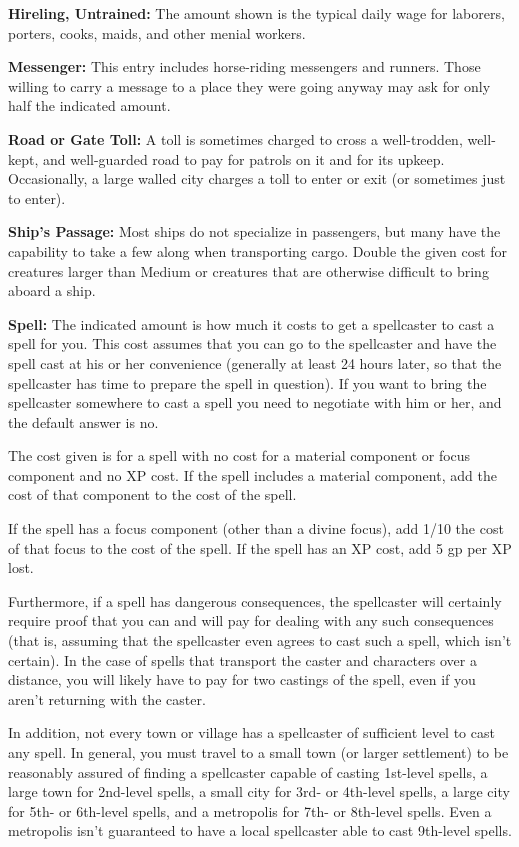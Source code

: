 \textbf{Hireling, Untrained:} The amount shown is the typical daily wage for laborers, 
porters, cooks, maids, and other menial workers.

\textbf{Messenger:} This entry includes horse-riding messengers and runners. Those 
willing to carry a message to a place they were going anyway may ask for only half 
the indicated amount.

\textbf{Road or Gate Toll:} A toll is sometimes charged to cross a well-trodden, 
well-kept, and well-guarded road to pay for patrols on it and for its upkeep. Occasionally, 
a large walled city charges a toll to enter or exit (or sometimes just to enter).

\textbf{Ship's Passage:} Most ships do not specialize in passengers, but many have 
the capability to take a few along when transporting cargo. Double the given cost 
for creatures larger than Medium or creatures that are otherwise difficult to bring 
aboard a ship.

\textbf{Spell:} The indicated amount is how much it costs to get a spellcaster 
to cast a spell for you. This cost assumes that you can go to the spellcaster and 
have the spell cast at his or her convenience (generally at least 24 hours later, 
so that the spellcaster has time to prepare the spell in question). If you want 
to bring the spellcaster somewhere to cast a spell you need to negotiate with him 
or her, and the default answer is no.

The cost given is for a spell with no cost for a material component or focus component 
and no XP cost. If the spell includes a material component, add the cost of that 
component to the cost of the spell.

If the spell has a focus component (other than a divine focus), add 1/10 the cost 
of that focus to the cost of the spell. If the spell has an XP cost, add 5 gp per 
XP lost. 

Furthermore, if a spell has dangerous consequences, the spellcaster will certainly 
require proof that you can and will pay for dealing with any such consequences 
(that is, assuming that the spellcaster even agrees to cast such a spell, which 
isn't certain). In the case of spells that transport the caster and characters 
over a distance, you will likely have to pay for two castings of the spell, even 
if you aren't returning with the caster.

In addition, not every town or village has a spellcaster of sufficient level to 
cast any spell. In general, you must travel to a small town (or larger settlement) 
to be reasonably assured of finding a spellcaster capable of casting 1st-level 
spells, a large town for 2nd-level spells, a small city for 3rd- or 4th-level spells, 
a large city for 5th- or 6th-level spells, and a metropolis for 7th- or 8th-level 
spells. Even a metropolis isn't guaranteed to have a local spellcaster able to 
cast 9th-level spells.